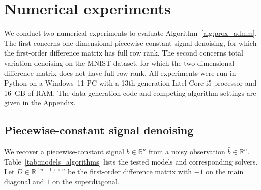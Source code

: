 \section{Numerical experiments}\label{sec:experiments}

We conduct two numerical experiments to evaluate
Algorithm~\ref{alg:prox_admm}. The first concerns one-dimensional
piecewise-constant signal denoising, for which the first-order
difference matrix has full row rank.
The second concerns total variation denoising on the MNIST dataset,
for which the two-dimensional difference matrix does not have full row rank. 
All experiments were run in Python on a Windows~11 PC with a
13th-generation Intel Core i5 processor and 16~GB of RAM.
The data-generation code and competing-algorithm settings are given in
the Appendix.

\subsection{Piecewise-constant signal denoising}\label{Signal}

We recover a piecewise-constant signal \(b\in\mathbb{R}^n\)
from a noisy observation \(\hat b\in\mathbb{R}^n\).
Table~\ref{tab:models_algorithms} lists the tested models and corresponding
solvers. Let \(D\in\mathbb{R}^{(n-1)\times n}\) be the first-order difference
matrix with \(-1\) on the main diagonal and \(1\) on the
superdiagonal.

